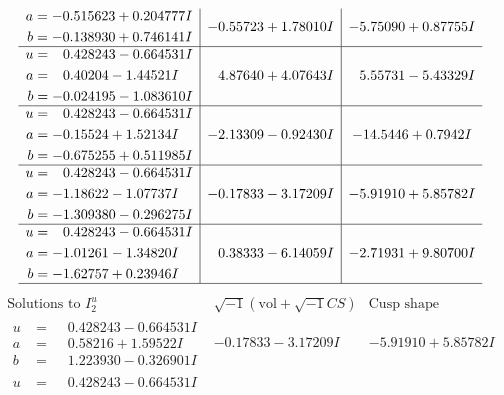 \documentclass[1p]{elsarticle_modified}
\theoremstyle{definition}
\newcommand{\I}{\sqrt{-1}}
\begin{document}
$$\begin{array}{c|c|c}
\begin{aligned}
a &= -0.515623 + 0.204777 I \\
b &= -0.138930 + 0.746141 I\end{aligned}
 & -0.55723 + 1.78010 I & -5.75090 + 0.87755 I \\ \hline\begin{aligned}
u &= \phantom{-}0.428243 - 0.664531 I \\
a &= \phantom{-}0.40204 - 1.44521 I \\
b &= -0.024195 - 1.083610 I\end{aligned}
 & \phantom{-}4.87640 + 4.07643 I & \phantom{-}5.55731 - 5.43329 I \\ \hline\begin{aligned}
u &= \phantom{-}0.428243 - 0.664531 I \\
a &= -0.15524 + 1.52134 I \\
b &= -0.675255 + 0.511985 I\end{aligned}
 & -2.13309 - 0.92430 I & -14.5446 + 0.7942 I \\ \hline\begin{aligned}
u &= \phantom{-}0.428243 - 0.664531 I \\
a &= -1.18622 - 1.07737 I \\
b &= -1.309380 - 0.296275 I\end{aligned}
 & -0.17833 - 3.17209 I & -5.91910 + 5.85782 I \\ \hline\begin{aligned}
u &= \phantom{-}0.428243 - 0.664531 I \\
a &= -1.01261 - 1.34820 I \\
b &= -1.62757 + 0.23946 I\end{aligned}
 & \phantom{-}0.38333 - 6.14059 I & -2.71931 + 9.80700 I\\
 \hline 
 \end{array}$$\newpage$$\begin{array}{c|c|c}  
\text{Solutions to }I^u_{2}& \I (\text{vol} + \sqrt{-1}CS) & \text{Cusp shape}\\
 \hline 
\begin{aligned}
u &= \phantom{-}0.428243 - 0.664531 I \\
a &= \phantom{-}0.58216 + 1.59522 I \\
b &= \phantom{-}1.223930 - 0.326901 I\end{aligned}
 & -0.17833 - 3.17209 I & -5.91910 + 5.85782 I \\ \hline\begin{aligned}
u &= \phantom{-}0.428243 - 0.664531 I \\

\end{aligned}
\end{array}$$
\end{document}
